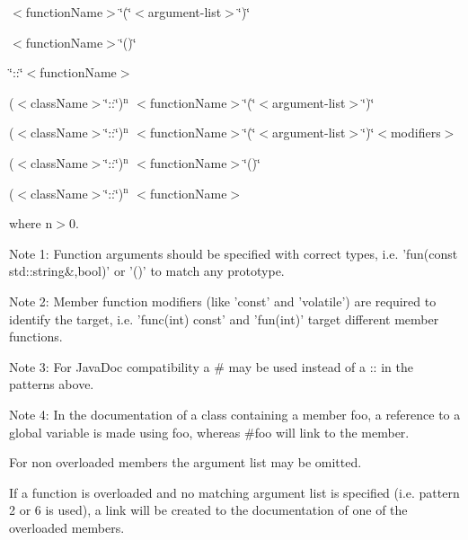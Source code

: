 \begin{DoxyEnumerate}
\item {\ttfamily $<$functionName$>$\char`\"{}(\char`\"{}$<$argument-\/list$>$\char`\"{})\char`\"{}} 
\item {\ttfamily $<$functionName$>$\char`\"{}()\char`\"{}} 
\item {\ttfamily \char`\"{}::\char`\"{}$<$functionName$>$} 
\item {\ttfamily ($<$className$>$\char`\"{}::\char`\"{})$^{\mbox{n}}$ $<$functionName$>$\char`\"{}(\char`\"{}$<$argument-\/list$>$\char`\"{})\char`\"{}} 
\item {\ttfamily ($<$className$>$\char`\"{}::\char`\"{})$^{\mbox{n}}$ $<$functionName$>$\char`\"{}(\char`\"{}$<$argument-\/list$>$\char`\"{})\char`\"{}$<$modifiers$>$} 
\item {\ttfamily ($<$className$>$\char`\"{}::\char`\"{})$^{\mbox{n}}$ $<$functionName$>$\char`\"{}()\char`\"{}} 
\item {\ttfamily ($<$className$>$\char`\"{}::\char`\"{})$^{\mbox{n}}$ $<$functionName$>$} 
\end{DoxyEnumerate}where n$>$0.

\begin{DoxyParagraph}{Note 1: }
Function arguments should be specified with correct types, i.e. 'fun(const std::string\&,bool)' or '()' to match any prototype. 
\end{DoxyParagraph}
\begin{DoxyParagraph}{Note 2:}
Member function modifiers (like 'const' and 'volatile') are required to identify the target, i.e. 'func(int) const' and 'fun(int)' target different member functions. 
\end{DoxyParagraph}
\begin{DoxyParagraph}{Note 3: }
For JavaDoc compatibility a \# may be used instead of a :: in the patterns above. 
\end{DoxyParagraph}
\begin{DoxyParagraph}{Note 4:}
In the documentation of a class containing a member foo, a reference to a global variable is made using foo, whereas \#foo will link to the member.
\end{DoxyParagraph}
For non overloaded members the argument list may be omitted.

If a function is overloaded and no matching argument list is specified (i.e. pattern 2 or 6 is used), a link will be created to the documentation of one of the overloaded members.

